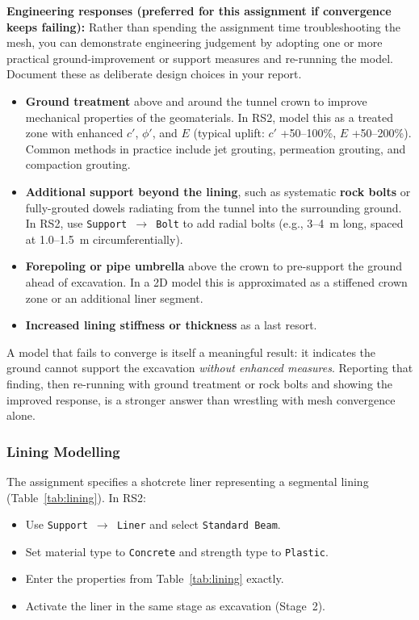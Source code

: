 \documentclass[a4paper,12pt]{article}
\begin{document}
\begin{warnbox}
\textbf{Engineering responses (preferred for this assignment if convergence keeps failing):}
Rather than spending the assignment time troubleshooting the mesh, you can demonstrate engineering judgement by adopting one or more practical ground-improvement or support measures and re-running the model. Document these as deliberate design choices in your report.
\begin{itemize}[nosep]
    \item \textbf{Ground treatment} above and around the tunnel crown to improve mechanical properties of the geomaterials. In RS2, model this as a treated zone with enhanced $c'$, $\phi'$, and $E$ (typical uplift: $c'$ +50--100\%, $E$ +50--200\%). Common methods in practice include jet grouting, permeation grouting, and compaction grouting.
    \item \textbf{Additional support beyond the lining}, such as systematic \textbf{rock bolts} or fully-grouted dowels radiating from the tunnel into the surrounding ground. In RS2, use \texttt{Support $\to$ Bolt} to add radial bolts (e.g., 3--4~m long, spaced at 1.0--1.5~m circumferentially).
    \item \textbf{Forepoling or pipe umbrella} above the crown to pre-support the ground ahead of excavation. In a 2D model this is approximated as a stiffened crown zone or an additional liner segment.
    \item \textbf{Increased lining stiffness or thickness} as a last resort.
\end{itemize}
\vspace{0.5em}

A model that fails to converge is itself a meaningful result: it indicates the ground cannot support the excavation \emph{without enhanced measures}. Reporting that finding, then re-running with ground treatment or rock bolts and showing the improved response, is a stronger answer than wrestling with mesh convergence alone.
\end{warnbox}

\subsubsection{Lining Modelling}
The assignment specifies a shotcrete liner representing a segmental lining (Table~\ref{tab:lining}). In RS2:
\begin{itemize}
    \item Use \texttt{Support $\to$ Liner} and select \texttt{Standard Beam}.
    \item Set material type to \texttt{Concrete} and strength type to \texttt{Plastic}.
    \item Enter the properties from Table~\ref{tab:lining} exactly.
    \item Activate the liner in the same stage as excavation (Stage~2).
\end{itemize}
\end{document}

